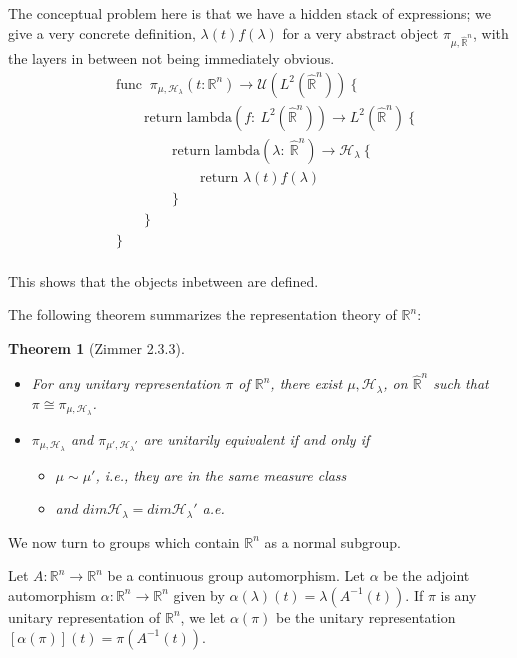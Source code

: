 \documentclass[
  12pt
]{article}
\theoremstyle{break}
\newtheorem{thm}{Theorem}[section]
\theoremstyle{plain}
\newcommand{\mpi}{\ensuremath{\pi}\xspace}
\newcommand{\bbr}{\ensuremath{\mathbb{R}}\xspace}
\begin{document}
  The conceptual problem here is that we have a hidden stack of expressions; we
  give a very concrete definition, $\lambda(t)f(\lambda)$ for a very abstract
  object $\pi_{\mu, \hat{\bbr}^n}$, with the layers in between not being
  immediately obvious.
  \begin{align*}
  & \text{func }\ \pi_{\mu,\mathscr{H}_{\lambda}}(t: \mathbb{R}^n) \rightarrow \mathcal{U}(L^2(\hat{\mathbb{R}}^n)) \ \{ \\
  & \qquad \text{return lambda}(f:\ L^2(\hat{\mathbb{R}}^n)) \rightarrow L^2(\hat{\mathbb{R}}^n) \ \{ \\
  & \qquad \qquad \text{return lambda}(\lambda:\ \hat{\mathbb{R}}^n) \rightarrow \mathscr{H}_{\lambda} \ \{ \\
  & \qquad \qquad \qquad \text{return }\lambda(t)f(\lambda) \\
  & \qquad \qquad \} \\
  & \qquad \} \\
  & \} \\
  \end{align*}

  This shows that the objects inbetween are defined.

  The following theorem summarizes the representation theory of $\bbr^n$:

  \begin{thm}[Zimmer 2.3.3]
    \label{thm:2.3.3}
    \begin{itemize}
      \item For any unitary representation $\pi$ of
        $\mathbb{R}^n$, there exist $\mu, \mathscr{H}_{\lambda}$, on
        $\hat{\mathbb{R}}^n$ such that $\pi \cong \pi_{\mu, \mathscr{H}_{\lambda}}$.
      \item $\pi_{\mu, \mathscr{H}_{\lambda}}$ and
        $\pi_{\mu', \mathscr{H}_{\lambda}'}$ are unitarily equivalent if and only if 
        \begin{itemize}
          \item $\mu \sim \mu'$, i.e., they are in the same measure class
          \item and $dim\mathscr{H}_{\lambda} = dim \mathscr{H}_{\lambda}'$ a.e.
        \end{itemize}
    \end{itemize}
  \end{thm}

  We now turn to groups which contain $\bbr^n$ as a normal subgroup.

  Let $A:\bbr^n \rightarrow \bbr^n$ be a continuous group automorphism. Let
  $\alpha$ be the adjoint automorphism $\alpha:\bbr^n \rightarrow \bbr^n$ given
  by $\alpha(\lambda)(t) = \lambda(A^{-1}(t))$. If \mpi is any unitary representation of $\bbr^n$, we let $\alpha(\pi)$  be the unitary representation $[\alpha(\pi)](t) = \pi(A^{-1}(t))$.
\end{document}
